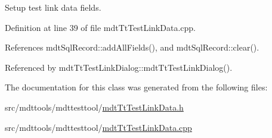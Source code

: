 Setup test link data fields. 



Definition at line 39 of file mdt\-Tt\-Test\-Link\-Data.\-cpp.



References mdt\-Sql\-Record\-::add\-All\-Fields(), and mdt\-Sql\-Record\-::clear().



Referenced by mdt\-Tt\-Test\-Link\-Dialog\-::mdt\-Tt\-Test\-Link\-Dialog().



The documentation for this class was generated from the following files\-:\begin{DoxyCompactItemize}
\item 
src/mdttools/mdttesttool/\hyperlink{mdt_tt_test_link_data_8h}{mdt\-Tt\-Test\-Link\-Data.\-h}\item 
src/mdttools/mdttesttool/\hyperlink{mdt_tt_test_link_data_8cpp}{mdt\-Tt\-Test\-Link\-Data.\-cpp}\end{DoxyCompactItemize}
